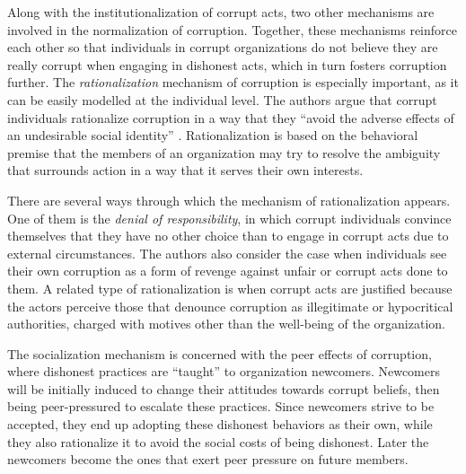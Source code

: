\documentclass[12pt,a4]{article}\usepackage[]{graphicx}\usepackage[]{xcolor}
\begin{document}
Along with the institutionalization of corrupt acts, two other mechanisms are involved in the normalization of corruption. Together, these mechanisms reinforce each other so that individuals in corrupt organizations do not believe they are really corrupt when engaging in dishonest acts, which in turn fosters corruption further. The \textit{rationalization} mechanism of corruption is especially important, as it can be easily modelled at the individual level. The authors argue that corrupt individuals rationalize corruption in a way that they \enquote{avoid the adverse effects of an undesirable social identity} \parencite[p.13]{Ashforth.2003}. Rationalization is based on the behavioral premise that the members of an organization may try to resolve the ambiguity that surrounds action in a way that it serves their own interests. 

There are several ways through which the mechanism of rationalization appears. One of them is the \textit{denial of responsibility}, in which corrupt individuals convince themselves that they have no other choice than to engage in corrupt acts due to external circumstances. The authors also consider the case when individuals see their own corruption as a form of revenge against unfair or corrupt acts done to them. A related type of rationalization is when corrupt acts are justified because the actors perceive those that denounce corruption as illegitimate or hypocritical authorities, charged with motives other than the well-being of the organization.

The socialization mechanism is concerned with the peer effects of corruption, where dishonest practices are \enquote{taught} to organization newcomers. Newcomers will be initially induced to change their attitudes towards corrupt beliefs, then being peer-pressured to escalate these practices. Since newcomers strive to be accepted, they end up adopting these dishonest behaviors as their own, while they also rationalize it to avoid the social costs of being dishonest. Later the newcomers become the ones that exert peer pressure on future members.
\end{document}
